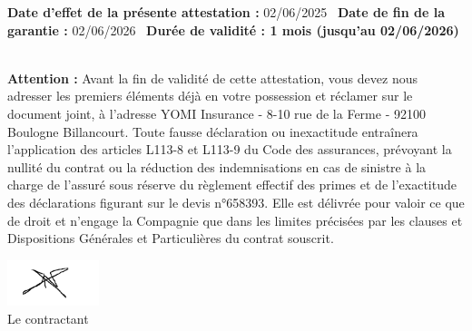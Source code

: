 \documentclass[a4paper]{article}
\begin{document}
\textbf{Date d'effet de la présente attestation :} 02/06/2025 \
\textbf{Date de fin de la garantie :} 02/06/2026 \
\textbf{Durée de validité : 1 mois (jusqu'au 02/06/2026)} \

\vspace{0.5cm}
\textbf{Attention :} Avant la fin de validité de cette attestation, vous devez nous adresser les premiers éléments déjà en votre possession et réclamer sur le document joint, à l’adresse YOMI Insurance - 8-10 rue de la Ferme - 92100 Boulogne Billancourt. Toute fausse déclaration ou inexactitude entraînera l’application des articles L113-8 et L113-9 du Code des assurances, prévoyant la nullité du contrat ou la réduction des indemnisations en cas de sinistre à la charge de l’assuré sous réserve du règlement effectif des primes et de l’exactitude des déclarations figurant sur le devis n°658393. Elle est délivrée pour valoir ce que de droit et n’engage la Compagnie que dans les limites précisées par les clauses et Dispositions Générales et Particulières du contrat souscrit.

\vspace{1cm}
\begin{center}
\includegraphics[width=0.2\textwidth]{683ddc1449ee98ad1f06109e_signature.png} \\
Le contractant
\end{center}
\end{document}
